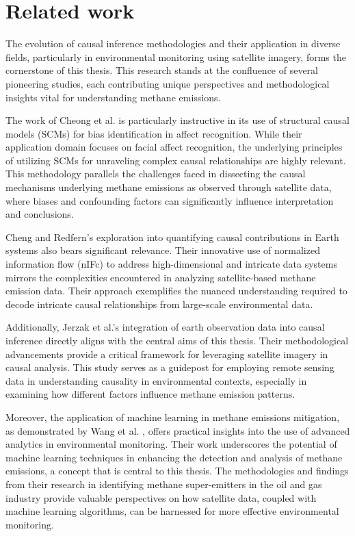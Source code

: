 \section{Related work}

The evolution of causal inference methodologies and their application in diverse fields, particularly in environmental monitoring using satellite imagery, forms the cornerstone of this thesis. This research stands at the confluence of several pioneering studies, each contributing unique perspectives and methodological insights vital for understanding methane emissions.

The work of Cheong et al. \cite{cheong2023} is particularly instructive in its use of structural causal models (SCMs) for bias identification in affect recognition. While their application domain focuses on facial affect recognition, the underlying principles of utilizing SCMs for unraveling complex causal relationships are highly relevant. This methodology parallels the challenges faced in dissecting the causal mechanisms underlying methane emissions as observed through satellite data, where biases and confounding factors can significantly influence interpretation and conclusions.

Cheng and Redfern’s exploration into quantifying causal contributions in Earth systems \cite{cheng2021} also bears significant relevance. Their innovative use of normalized information flow (nIFc) to address high-dimensional and intricate data systems mirrors the complexities encountered in analyzing satellite-based methane emission data. Their approach exemplifies the nuanced understanding required to decode intricate causal relationships from large-scale environmental data.

Additionally, Jerzak et al.'s \cite{jerzak2023} integration of earth observation data into causal inference directly aligns with the central aims of this thesis. Their methodological advancements provide a critical framework for leveraging satellite imagery in causal analysis. This study serves as a guidepost for employing remote sensing data in understanding causality in environmental contexts, especially in examining how different factors influence methane emission patterns.

Moreover, the application of machine learning in methane emissions mitigation, as demonstrated by Wang et al. \cite{wang2020}, offers practical insights into the use of advanced analytics in environmental monitoring. Their work underscores the potential of machine learning techniques in enhancing the detection and analysis of methane emissions, a concept that is central to this thesis. The methodologies and findings from their research in identifying methane super-emitters in the oil and gas industry provide valuable perspectives on how satellite data, coupled with machine learning algorithms, can be harnessed for more effective environmental monitoring.


